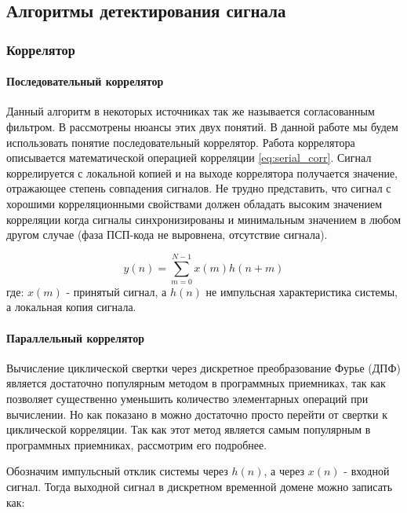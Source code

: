 \subsection{Алгоритмы детектирования сигнала}

\subsubsection{Коррелятор}

\paragraph{Последовательный коррелятор}
\label{sec1_serial}
Данный алгоритм в некоторых источниках так же называется согласованным фильтром. В \cite{sklyar} рассмотрены нюансы этих двух понятий.
В данной работе мы будем использовать понятие последовательный коррелятор. Работа коррелятора описывается математической операцией
корреляции \ref{eq:serial_corr}. Сигнал коррелируется с локальной копией и на выходе коррелятора получается значение, отражающее
степень совпадения сигналов. Не трудно представить, что сигнал с хорошими корреляционными свойствами должен обладать высоким значением
корреляции когда сигналы синхронизированы и минимальным значением в любом другом случае (фаза ПСП-кода не выровнена, отсутствие сигнала).

\begin{equation}
	\label{eq:serial_corr}
	y(n)=\sum\limits_{m=0}^{N-1}{x(m)h(n+m)}
\end{equation}
где: ${x(m)}$ - принятый сигнал, а ${h(n)}$ не импульсная характеристика системы, а локальная копия сигнала.

\paragraph{Параллельный коррелятор}
\label{sec1_fft}
Вычисление циклической свертки через дискретное преобразование Фурье (ДПФ) является достаточно популярным методом
в программных приемниках, так как позволяет существенно 
уменьшить количество элементарных операций при вычислении. Но как показано в \cite{tsui, oppenheim} можно достаточно просто
перейти от свертки к циклической корреляции. Так как этот метод является самым популярным в программных приемниках, рассмотрим его
подробнее.

Обозначим импульсный отклик системы через $h(n)$, а через ${x(n)}$ - входной сигнал. Тогда выходной сигнал в дискретном
временной домене можно записать как:


